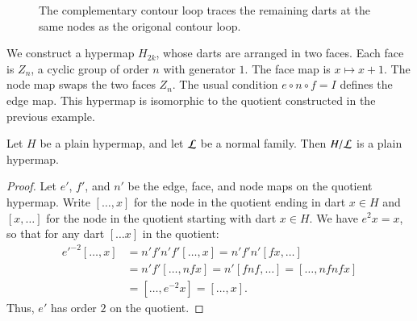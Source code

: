\begin{figure}[htb]
  \centering
  \caption{The complementary contour loop traces the remaining darts
   at the same nodes as the origonal contour loop.}
  \label{fig:contour-comp}
\end{figure}


\begin{example}\label{ex:H2k} 
We 
construct a
hypermap $H_{2k}$, whose darts are arranged in two faces.  Each
face is $Z_n$, a cyclic group of order $n$ with generator $1$.
The face map is $x\mapsto x+1$.
The node map swaps the two faces $Z_n$.
The usual condition $e\circ n\circ f = I$ defines the edge map.
This hypermap is isomorphic to the quotient constructed in
the previous example.
\end{example}

\begin{lemma} Let $H$ be a plain hypermap, and let $\cal L$ be a
normal family.  Then $H/{\cal L}$ is a plain hypermap.
\end{lemma}

\begin{proof} Let $e'$, $f'$, and $n'$ be the edge, face, and node maps on the
quotient hypermap.  Write $[\ldots, x]$ for the node in the quotient
ending in dart $x\in H$ and $[x,\ldots]$ for the node in the quotient
starting with dart $x\in H$.  We have $e^2 x = x$, so that for any
dart $[\ldots x]$ in the quotient:
    $$\begin{array}{lll}
    {e'}^{-2} [\ldots, x] &= n' f' n' f' [\ldots, x] = n' f' n' [f x, \ldots] \\&=
    n' f' [\ldots, n f x] = n' [f n f, \ldots] = [\ldots, n f n f x]\\ &=
    [\ldots, e^{-2} x] = [\ldots, x].
    \end{array}$$
Thus, $e'$ has order $2$ on the quotient.
\end{proof}

%


